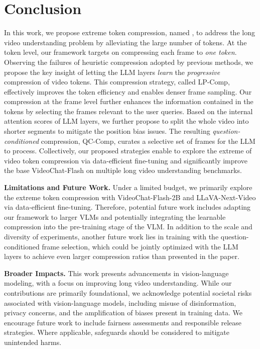 
\section{Conclusion}

In this work, we propose extreme token compression, named \textbf{\name}, to address the long video understanding problem by alleviating the large number of tokens. At the token level, our \name framework targets on compressing each frame to \emph{one token}. Observing the failures of heuristic compression adopted by previous methods, we propose the key insight of letting the LLM layers \emph{learn} the \emph{progressive} compression of video tokens. This compression strategy, called LP-Comp, effectively improves the token efficiency and enables denser frame sampling. Our compression at the frame level further enhances the information contained in the tokens by selecting the frames relevant to the user queries. Based on the internal attention scores of LLM layers, we further propose to split the whole video into shorter segments to mitigate the position bias issues. The resulting \emph{question-conditioned} compression, QC-Comp, curates a selective set of frames for the LLM to process. Collectively, our proposed strategies enable \name to explore the extreme of video token compression via data-efficient fine-tuning and significantly improve the base VideoChat-Flash on multiple long video understanding benchmarks.

\noindent \textbf{Limitations and Future Work.} Under a limited budget, we primarily explore the extreme token compression with VideoChat-Flash-2B and LLaVA-Next-Video via data-efficient fine-tuning. Therefore, potential future work includes adapting our \name framework to larger VLMs and potentially integrating the learnable compression into the pre-training stage of the VLM. In addition to the scale and diversity of experiments, another future work lies in training with the question-conditioned frame selection, which could be jointly optimized with the LLM layers to achieve even larger compression ratios than presented in the paper. 

\noindent \textbf{Broader Impacts.} This work presents advancements in vision-language modeling, with a focus on improving long video understanding. While our contributions are primarily foundational, we acknowledge potential societal risks associated with vision-language models, including misuse of disinformation, privacy concerns, and the amplification of biases present in training data. We encourage future work to include fairness assessments and responsible release strategies. Where applicable, safeguards should be considered to mitigate unintended harms.
